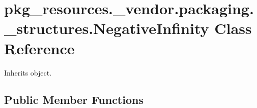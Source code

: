 \hypertarget{classpkg__resources_1_1__vendor_1_1packaging_1_1__structures_1_1_negative_infinity}{}\section{pkg\+\_\+resources.\+\_\+vendor.\+packaging.\+\_\+structures.\+Negative\+Infinity Class Reference}
\label{classpkg__resources_1_1__vendor_1_1packaging_1_1__structures_1_1_negative_infinity}


Inherits object.

\subsection*{Public Member Functions}
